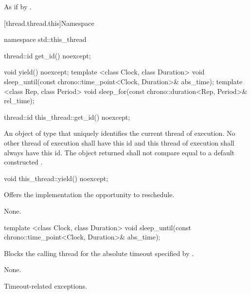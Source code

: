 \begin{itemdescr}
\pnum\effects As if by .
\end{itemdescr}

[thread.thread.this]{Namespace }

\begin{codeblock}
namespace std::this_thread {
  thread::id get_id() noexcept;

  void yield() noexcept;
  template <class Clock, class Duration>
    void sleep_until(const chrono::time_point<Clock, Duration>& abs_time);
  template <class Rep, class Period>
    void sleep_for(const chrono::duration<Rep, Period>& rel_time);
}
\end{codeblock}

%
\begin{itemdecl}
thread::id this_thread::get_id() noexcept;
\end{itemdecl}

\begin{itemdescr}
\pnum
\returns An object of type  that uniquely identifies the current thread of
execution. No other thread of execution shall have this id and this thread of execution shall
always have this id. The object returned shall not compare equal to a default constructed
.
\end{itemdescr}

%
\begin{itemdecl}
void this_thread::yield() noexcept;
\end{itemdecl}

\begin{itemdescr}
\pnum
\effects Offers the implementation the opportunity to reschedule.

\pnum
\sync None.
\end{itemdescr}

%
\begin{itemdecl}
template <class Clock, class Duration>
  void sleep_until(const chrono::time_point<Clock, Duration>& abs_time);
\end{itemdecl}

\begin{itemdescr}
\pnum
\effects Blocks the calling thread for the absolute timeout specified
by .

\pnum
\sync None.

\pnum
\throws Timeout-related exceptions.
\end{itemdescr}

